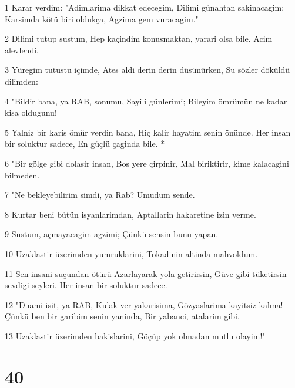 \par 1 Karar verdim: "Adimlarima dikkat edecegim, Dilimi günahtan sakinacagim; Karsimda kötü biri oldukça, Agzima gem vuracagim."
\par 2 Dilimi tutup sustum, Hep kaçindim konusmaktan, yarari olsa bile. Acim alevlendi,
\par 3 Yüregim tutustu içimde, Ates aldi derin derin düsünürken, Su sözler döküldü dilimden:
\par 4 "Bildir bana, ya RAB, sonumu, Sayili günlerimi; Bileyim ömrümün ne kadar kisa oldugunu!
\par 5 Yalniz bir karis ömür verdin bana, Hiç kalir hayatim senin önünde. Her insan bir soluktur sadece, En güçlü çaginda bile. *
\par 6 "Bir gölge gibi dolasir insan, Bos yere çirpinir, Mal biriktirir, kime kalacagini bilmeden.
\par 7 "Ne bekleyebilirim simdi, ya Rab? Umudum sende.
\par 8 Kurtar beni bütün isyanlarimdan, Aptallarin hakaretine izin verme.
\par 9 Sustum, açmayacagim agzimi; Çünkü sensin bunu yapan.
\par 10 Uzaklastir üzerimden yumruklarini, Tokadinin altinda mahvoldum.
\par 11 Sen insani suçundan ötürü Azarlayarak yola getirirsin, Güve gibi tüketirsin sevdigi seyleri. Her insan bir soluktur sadece.
\par 12 "Duami isit, ya RAB, Kulak ver yakarisima, Gözyaslarima kayitsiz kalma! Çünkü ben bir garibim senin yaninda, Bir yabanci, atalarim gibi.
\par 13 Uzaklastir üzerimden bakislarini, Göçüp yok olmadan mutlu olayim!"

\chapter{40}

